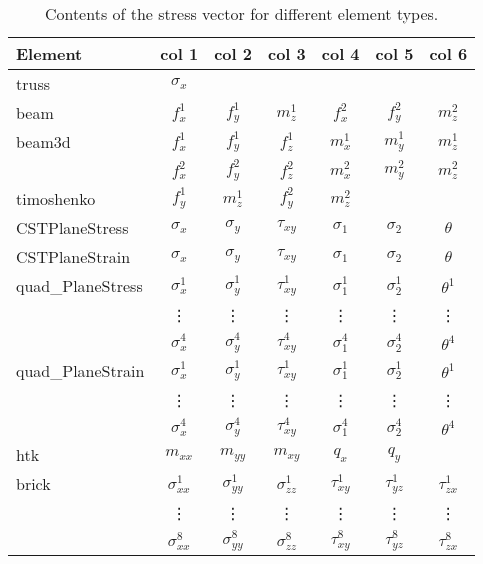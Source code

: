 \begin{table}[tbh]
\begin{center}
 \begin{tabular}{|l|c|c|c|c|c|c|}
\hline
Element		& col 1	& col 2	& col 3	& col 4	& col 5	& col 6 \\
\hline\hline
truss		& $\sigma_x$ & & & & & \\
beam		& $f_x^1$ & $f_y^1$ & $m_z^1$ & $f_x^2$ & $f_y^2$ & $m_z^2$ \\ 
beam3d		& $f_x^1$ & $f_y^1$ & $f_z^1$ & $m_x^1$ & $m_y^1$ & $m_z^1$ \\ 
      	 	& $f_x^2$ & $f_y^2$ & $f_z^2$ & $m_x^2$ & $m_y^2$ & $m_z^2$ \\ 
timoshenko	& $f_y^1$ & $m_z^1$ & $f_y^2$ & $m_z^2$ & & \\ 
CSTPlaneStress	& $\sigma_x$ & $\sigma_y$ & $\tau_{xy}$ & $\sigma_1$ & $\sigma_2$ & $\theta$ \\
CSTPlaneStrain	& $\sigma_x$ & $\sigma_y$ & $\tau_{xy}$ & $\sigma_1$ & $\sigma_2$ & $\theta$ \\
quad\_PlaneStress & $\sigma_x^1$ & $\sigma_y^1$ & $\tau_{xy}^1$ & $\sigma_1^1$ & $\sigma_2^1$ & $\theta^1$ \\
                  & \vdots       & \vdots       & \vdots        & \vdots       & \vdots       & \vdots     \\
                  & $\sigma_x^4$ & $\sigma_y^4$ & $\tau_{xy}^4$ & $\sigma_1^4$ & $\sigma_2^4$ & $\theta^4$ \\
quad\_PlaneStrain & $\sigma_x^1$ & $\sigma_y^1$ & $\tau_{xy}^1$ & $\sigma_1^1$ & $\sigma_2^1$ & $\theta^1$ \\
                  & \vdots       & \vdots       & \vdots        & \vdots       & \vdots       & \vdots     \\
                  & $\sigma_x^4$ & $\sigma_y^4$ & $\tau_{xy}^4$ & $\sigma_1^4$ & $\sigma_2^4$ & $\theta^4$ \\
htk 		& $m_{xx}$ & $m_{yy}$ & $m_{xy}$ & $q_x$ & $q_y$ & \\
brick  		& $\sigma_{xx}^1$ & $\sigma_{yy}^1$ & $\sigma_{zz}^1$ & $\tau_{xy}^1$ & $\tau_{yz}^1$ & $\tau_{zx}^1$ \\
     		& \vdots          & \vdots          & \vdots          & \vdots        & \vdots        & \vdots        \\
     		& $\sigma_{xx}^8$ & $\sigma_{yy}^8$ & $\sigma_{zz}^8$ & $\tau_{xy}^8$ & $\tau_{yz}^8$ & $\tau_{zx}^8$ \\
  \hline
 \end{tabular}
\end{center}
\caption{Contents of the stress vector for different element types.}
\label{felt_prog.stress_table}
\end{table}


